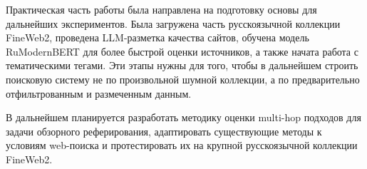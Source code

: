 \documentclass[oneside,senior,etd]{BYUPhys}
\begin{document}
Практическая часть работы была направлена на подготовку основы для дальнейших экспериментов. 
Была загружена часть русскоязычной коллекции FineWeb2, проведена LLM-разметка качества сайтов, 
обучена модель RuModernBERT для более быстрой оценки источников, а также начата работа с тематическими тегами. 
Эти этапы нужны для того, чтобы в дальнейшем строить поисковую систему не по произвольной шумной коллекции, 
а по предварительно отфильтрованным и размеченным данным.

В дальнейшем планируется разработать методику оценки multi-hop подходов для задачи обзорного реферирования, 
адаптировать существующие методы к условиям web-поиска и протестировать их на крупной русскоязычной коллекции FineWeb2.


\raggedright

\end{document}
